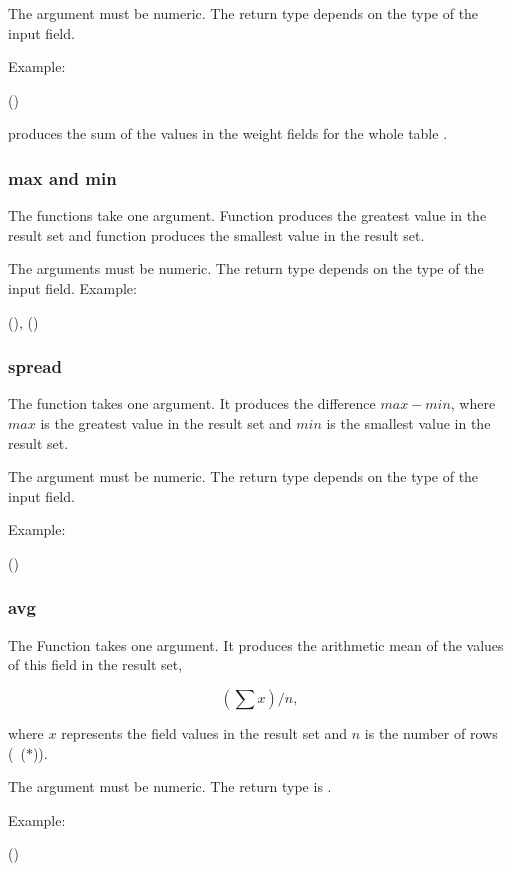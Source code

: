 The argument must be numeric.
The return type depends on the type of the input field.

Example:

 ()  

produces the sum of the values in the weight fields
for the whole table .

\subsubsection{max and min}
The functions take one argument.
Function  produces the greatest value in the result set
and function  produces the smallest value in the result set.

The arguments must be numeric.
The return type depends on the type of the input field.
Example:

 (),
                 ()
 

\subsubsection{spread}
The function takes one argument.
It produces the difference $max - min$,
where $max$ is the greatest value in the result set
and $min$ is the smallest value in the result set.

The argument must be numeric.
The return type depends on the type of the input field.

Example:

 ()
 

\subsubsection{avg}
The Function takes one argument.
It produces the arithmetic mean of the values
of this field in the result set, \ie

\[
\left(\sum{x}\right)/n,
\]

where $x$ represents the
field values in the result set and $n$
is the number of rows (\ie\ ($\ast$)).

The argument must be numeric.
The return type is .

Example:

 ()
 

